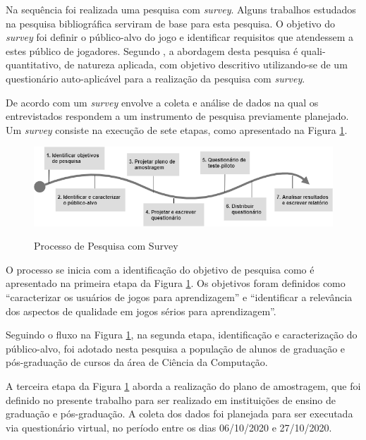 Na sequência foi realizada uma pesquisa com \textit{survey}. Alguns trabalhos estudados \cite{Petri_Wangenheim_2019, deSales_SousaeSilva_2020} na pesquisa bibliográfica serviram de base para esta pesquisa. O objetivo do \textit{survey} foi definir o público-alvo do jogo e identificar requisitos que atendessem a estes público de jogadores. Segundo , a abordagem desta pesquisa é quali-quantitativo, de natureza aplicada, com objetivo descritivo utilizando-se de um questionário auto-aplicável para a realização da pesquisa com \textit{survey}. 

De acordo com  um \textit{survey} envolve a coleta e análise de dados na qual os entrevistados respondem a um instrumento de pesquisa previamente planejado. Um \textit{survey} consiste na execução de sete etapas, como apresentado na Figura \ref{Fig:survey_flow.png}.

\begin{figure}[htbp]
	\centering
	\caption{Processo de Pesquisa com Survey}
	\includegraphics[keepaspectratio=true,scale=0.55]{figuras/metodologia/flow_survey.png}
	\label{Fig:survey_flow.png}
\end{figure}

O processo se inicia com a identificação do objetivo de pesquisa como é apresentado na primeira etapa da Figura \ref{Fig:survey_flow.png}. Os objetivos foram definidos como ``caracterizar os usuários de jogos para aprendizagem'' e ``identificar a relevância dos aspectos de qualidade em jogos sérios para aprendizagem''. 

Seguindo o fluxo na Figura \ref{Fig:survey_flow.png}, na segunda etapa, identificação e caracterização do público-alvo, foi adotado nesta pesquisa a população de alunos de graduação e pós-graduação de cursos da área de Ciência da Computação. 

A terceira etapa da Figura \ref{Fig:survey_flow.png} aborda a realização do plano de amostragem, que foi definido no presente trabalho para ser realizado em instituições de ensino de graduação e pós-graduação. A coleta dos dados foi planejada para ser executada via questionário virtual, no período entre os dias 06/10/2020 e 27/10/2020. 

